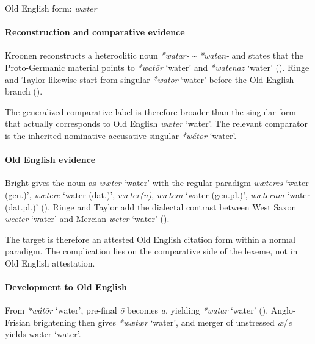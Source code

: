 \documentclass[
  british,
  a4paper,
]{article}
\providecommand{\Recon}[1]{\emph{*#1}}
\begin{document}
Old English form: \emph{wæter}

\paragraph{Reconstruction and comparative
evidence}\label{reconstruction-and-comparative-evidence-119}

Kroonen reconstructs a heteroclitic noun \emph{*watar-}
\textasciitilde{} \emph{*watan-} and states that the Proto-Germanic
material points to \Recon{watōr} `water' and \Recon{watenaz} `water'
(). Ringe and Taylor
likewise start from singular \Recon{wator} `water' before the Old
English branch ().

The generalized comparative label is therefore broader than the singular
form that actually corresponds to Old English {\emph{wæter}} `water'.
The relevant comparator is the inherited nominative-accusative singular
\Recon{wátōr} `water'.

\paragraph{Old English evidence}\label{old-english-evidence-121}

Bright gives the noun as {\emph{wæter}} `water' with the regular
paradigm {\emph{wæteres}} `water (gen.)', {\emph{wætere}} `water
(dat.)', \emph{wæter(u)}, {\emph{wætera}} `water (gen.pl.)',
{\emph{wæterum}} `water (dat.pl.)'
(). Ringe and
Taylor add the dialectal contrast between West Saxon \emph{weeter}
`water' and Mercian \emph{weter} `water'
().

The target is therefore an attested Old English citation form within a
normal paradigm. The complication lies on the comparative side of the
lexeme, not in Old English attestation.

\paragraph{Development to Old
English}\label{development-to-old-english-119}

From \Recon{wátōr} `water', pre-final \emph{ō} becomes \emph{a},
yielding \Recon{watar} `water' (). Anglo-Frisian brightening then gives
\Recon{wætær} `water', and merger of unstressed \emph{æ}/\emph{e} yields
{wæter} `water'.
\end{document}
